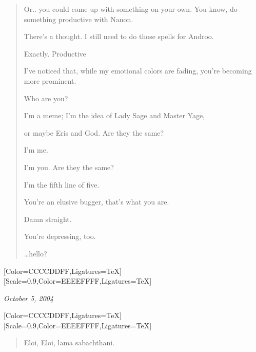 \begin{paracol}{2}
\begin{leftcolumn}
\begin{quotation}
\begin{ally}
Or.. you could come up with something on your own. You know, do something productive with Nanon.
\end{ally}
\noindent There's a thought. I still need to do those spells for Androo.

\begin{ally}
Exactly. Productive
\end{ally}
\noindent I've noticed that, while my emotional colors are fading, you're becoming more prominent.

Who are you?

\begin{ally}
I'm a meme; I'm the idea of Lady Sage and Master Yage,
\end{ally}
\begin{ally}
or maybe Eris and God. Are they the same?
\end{ally}
\begin{ally}
I'm me.
\end{ally}
\begin{ally}
I'm you. Are they the same?
\end{ally}
\begin{ally}
I'm the fifth line of five.
\end{ally}
\noindent You're an elusive bugger, that's what you are.

\begin{ally}
Damn straight.
\end{ally}
\noindent You're depressing, too.

\vspace{2\onelineskip}

\noindent\ldots{}hello?
\end{quotation}
\newpage
\end{leftcolumn}
\begin{rightcolumn*}
  [Color=CCCCDDFF,Ligatures=TeX]
  \renewfontfamily{}[Scale=0.9,Color=EEEEFFFF,Ligatures=TeX]
\begin{flushright}
    \emph{October 5, 2004}
\end{flushright}
\end{rightcolumn*}
\begin{leftcolumn}
  [Color=CCCCDDFF,Ligatures=TeX]
  \renewfontfamily{}[Scale=0.9,Color=EEEEFFFF,Ligatures=TeX]
\begin{quotation}
\noindent Eloi, Eloi, lama sabachthani.


\end{quotation}
\end{leftcolumn}
\end{paracol}
